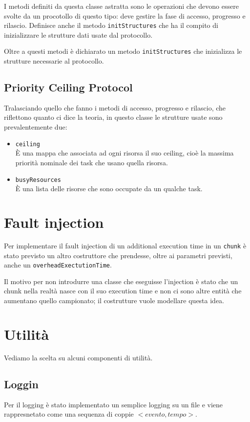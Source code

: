 I metodi definiti da questa classe astratta sono le operazioni che devono essere svolte da un procotollo di questo tipo: deve gestire la fase di accesso, progresso e rilascio. Definisce anche il metodo \texttt{initStructures} che ha il compito di inizializzare le strutture dati usate dal protocollo.

Oltre a questi metodi è dichiarato un metodo \texttt{initStructures} che inizializza le strutture necessarie al protocollo.

\subsection{Priority Ceiling Protocol}
Tralasciando quello che fanno i metodi di accesso, progresso e rilascio, che riflettono quanto ci dice la teoria, in questo classe le strutture usate sono prevalentemente due:
\begin{itemize}
    \item \texttt{ceiling} \\
        È una mappa che associata ad ogni risorsa il suo ceiling, cioè la massima priorità nominale dei task che usano quella risorsa.
    \item \texttt{busyResources}\\
        È una lista delle risorse che sono occupate da un qualche task.
\end{itemize}

\section{Fault injection}
Per implementare il fault injection di un additional execution time in un \texttt{chunk} è stato previsto un altro costruttore che prendesse, oltre ai parametri previsti, anche un \texttt{overheadExectutionTime}.

Il motivo per non introdurre una classe che eseguisse l'injection è stato che un chunk nella realtà nasce con il suo execution time e non ci sono altre entità che aumentano quello campionato; il costrutture vuole modellare questa idea.

\section{Utilità}
Vediamo la scelta su alcuni componenti di utilità.

\subsection{Loggin}
Per il logging è stato implementato un semplice logging su un file e viene rappresnetato come una sequenza di coppie $<evento,tempo>$.

